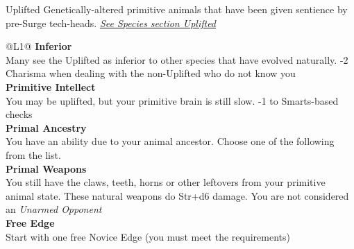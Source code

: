 \begin{genericsection}{Uplifted}
  Genetically-altered primitive animals that have been given sentience by pre-Surge tech-heads. \textit{\hyperref[sec:specie-uplifted]{See Species section Uplifted}}
\end{genericsection}

\begin{redtable}{\linewidth}{@{}L{1}@{}}
  \textbf{Inferior}\\
  Many see the Uplifted as inferior to other species that have evolved naturally. -2 Charisma when dealing with the non-Uplifted who do not know you\\
  \textbf{Primitive Intellect}\\
  You may be uplifted, but your primitive brain is still slow. -1 to Smarts-based checks\\
  \textbf{Primal Ancestry}\\
  You have an ability due to your animal ancestor. Choose one of the following from the list.\\
  \textbf{Primal Weapons}\\
  You still have the claws, teeth, horns or other leftovers from your primitive animal state. These natural weapons do Str+d6 damage. You are not considered an \textit{Unarmed Opponent}\\
  \textbf{Free Edge}\\
  Start with one free Novice Edge (you must meet the requirements)\\
\end{redtable}

